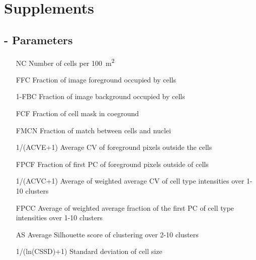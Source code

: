 \section*{Supplements}
\subsection*{- Parameters}
\begin{itemize}
\centering
    \item[NC] Number of cells per 100\unit{\micro\square\meter}
    \item[FFC] Fraction of image foreground occupied by cells
    \item[1-FBC] Fraction of image background occupied by cells
    \item[FCF] Fraction of cell mask in coeground
    \item[FMCN] Fraction of match between cells and nuclei
    \item[1/(ACVE+1)] Average CV of foreground pixels outside the cells
    \item[FPCF] Fraction of first PC of foreground pixels outside of cells
    \item[1/(ACVC+1)] Average of weighted average CV of cell type intensities over 1-10 clusters
    \item[FPCC] Average of weighted average fraction of the first PC of cell type intensities over 1-10 clusters
    \item[AS] Average Silhouette score of clustering over 2-10 clusters
    \item[1/(ln(CSSD)+1)] Standard deviation of cell size
\end{itemize}
